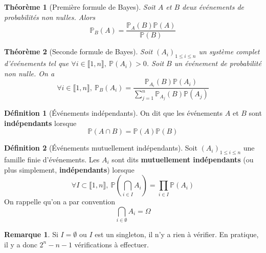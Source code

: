 \documentclass[french]{book}
\renewcommand{\P}{\mathbb{P}}
\theoremstyle{plain}
\newtheorem{thm}{Théorème}[chapter]
\theoremstyle{definition}
\newtheorem{dfn}{Définition}[chapter]
\newtheorem{rmq}{Remarque}[chapter]
\theoremstyle{remark}
\begin{document}
\begin{thm}[Première formule de Bayes]
	Soit $A$ et $B$ deux événements de probabilités non nulles. Alors $$\P_B(A)=\frac{\P_A(B)\P(A)}{\P(B)}$$
\end{thm} 
\begin{thm}[Seconde formule de Bayes]
	Soit $(A_i)_{1\leqslant i\leqslant n}$ un système complet d'événements tel que $\forall i \in\llbracket1,n\rrbracket, \ \P(A_i)>0$. Soit $B$ un événement de probabilité non nulle. On a $$\forall i\in\llbracket1,n\rrbracket, \ \P_B(A_i)=\frac{\P_{A_i}(B)\P(A_i)}{\displaystyle\sum_{j=1}^{n}\P_{A_j}(B)\P(A_j)}$$
\end{thm}
\begin{dfn}[Événements indépendants]
	On dit que les événements $A$ et $B$ sont \textbf{indépendants} lorsque $$\P(A\cap B)=\P(A)\P(B)$$
\end{dfn}
\begin{dfn}[Événements mutuellement indépendants]
	Soit $(A_i)_{1\leqslant i\leqslant n}$ une famille finie d'événements. Les $A_i$ sont dits \textbf{mutuellement indépendants} (ou plus simplement, \textbf{indépendants}) lorsque $$\forall I\subset\llbracket1,n\rrbracket, \ \P\left(\bigcap_{i\in I}A_i\right)=\prod_{i\in I}\P(A_i)$$ On rappelle qu'on a par convention $$\bigcap_{i\in\emptyset}A_i=\Omega$$
\end{dfn}
\begin{rmq} Si $I=\emptyset$ ou $I$ est un singleton, il n'y a rien à vérifier. En pratique, il y a donc $2^n-n-1$ vérifications à effectuer. \end{rmq}
\end{document}
